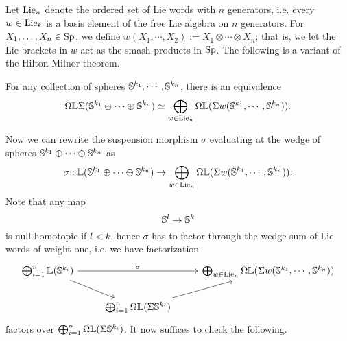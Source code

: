 Let $\operatorname{Lie}_n$ denote the ordered set of Lie words with $n$ generators, i.e. every $w \in \operatorname{Lie}_k$ is a basis element of the free Lie algebra on $n$ generators.
For $X_1, \dots, X_n \in \operatorname{Sp}$, we define $w(X_1, \cdots, X_2):= X_1\otimes \cdots \otimes X_n$; that is, we let the Lie brackets in $w$ act as the smash products in $\operatorname{Sp}$. 
The following is a variant of the Hilton-Milnor theorem.
\begin{theorem}
	For any collection of spheres ${\mathbb{S}}^{k_1}, \cdots, {\mathbb{S}}^{k_n}$, there is an equivalence
	$$
	\Omega {\mathbb{L}} \Sigma({\mathbb{S}}^{k_1}\oplus \cdots \oplus {\mathbb{S}}^{k_n})
	\simeq 
	\bigoplus_{w\in \operatorname{Lie}_n} \Omega {\mathbb{L}}( \Sigma w({\mathbb{S}}^{k_1}, \cdots, {\mathbb{S}}^{k_n})).
	$$
\end{theorem}

Now we can rewrite the suspension morphism $\sigma$ evaluating at the wedge of spheres ${\mathbb{S}}^{k_1}\oplus \cdots \oplus {\mathbb{S}}^{k_n}$ as 
$$
\sigma: 
{\mathbb{L}}({\mathbb{S}}^{k_1}\oplus \cdots \oplus {\mathbb{S}}^{k_n})
\to 
\bigoplus_{w\in \operatorname{Lie}_n} \Omega {\mathbb{L}} (\Sigma w({\mathbb{S}}^{k_1}, \cdots, {\mathbb{S}}^{k_n})).
$$
Note that any map 
$$
{\mathbb{S}}^{l} \to 
{\mathbb{S}}^{k}
$$
is null-homotopic if $l < k$,
hence $\sigma$ has to factor through the wedge sum of Lie words of weight one, i.e. we have factorization
\[
\begin{tikzcd}
	\bigoplus_{i=1}^{n} \BL(\BS^{k_i}) &   &  \bigoplus_{w\in \Lie_n} \Omega \BL (\Sigma w(\BS^{k_1}, \cdots, \BS^{k_n}))\\
	& \bigoplus_{i=1}^{n}\Omega \BL (\Sigma \BS^{k_i})  &
	\arrow[from=1-1, to = 1-3, "\sigma"]
	\arrow[from=1-1 , to =2-2]
	\arrow[from=2-2, to=1-3]
\end{tikzcd}
\]
 factors over $\bigoplus_{i=1}^{n}\Omega {\mathbb{L}} (\Sigma {\mathbb{S}}^{k_i})$.
 It now suffices to check the following.
 
